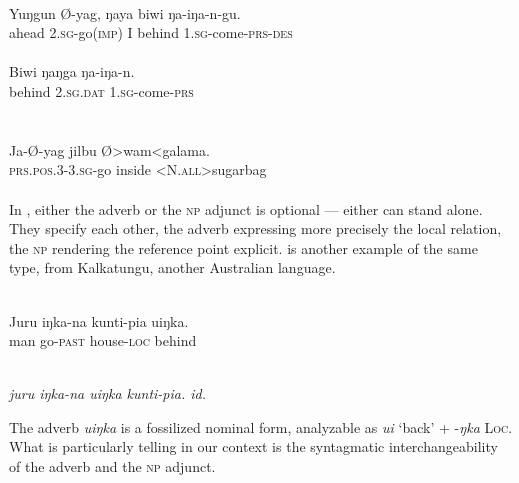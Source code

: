 \ea\label{ex:E64}
 \\
 \ea
 \gll Yuŋgun  Ø-yag,  ŋaya  biwi  ŋa-iŋa-n-gu.\\
  ahead  2.\textsc{sg}-go(\textsc{imp})  I  behind  1.\textsc{sg}-come-\textsc{prs}-\textsc{des}\\
\\
\ex
\gll  Biwi  ŋaŋga  ŋa-iŋa-n.\\
   behind  2.\textsc{sg}.\textsc{dat}  1.\textsc{sg}-come-\textsc{prs}\\
\\
\z
\z
\noindent \ea\label{ex:E65}
\\
\gll Ja-Ø-yag  jilbu  Ø{\textgreater}wam{\textless}galama.\\
 \textsc{prs}.\textsc{pos}.3-3.\textsc{sg}-go  inside  {\textless}N.\textsc{all}{\textgreater}sugarbag\\
\\
\z
\noindent In , either the adverb or the \textsc{np} adjunct is optional — either can stand alone. They specify each other, the adverb expressing more precisely the local relation, the \textsc{np} rendering the reference point explicit.  is another example of the same type, from Kalkatungu, another Australian language.

\ea\label{ex:E66}
 \\
\gll Juru  iŋka-na  kunti-pia  uiŋka.\\
man  go-\textsc{past}  house-\textsc{loc}  behind\\
\\
\z
\noindent %

\begin{exe} %
	 \itshape juru iŋka-na uiŋka kunti-pia.    
	\glt id.
\end{exe}


\noindent\label{page96}The adverb \textit{uiŋka} is a fossilized nominal form, analyzable as \textit{ui} ‘back’ + -\textit{ŋka} \textsc{Loc}. What is particularly telling in our context is the syntagmatic interchangeability of the adverb and the \textsc{np} adjunct.

